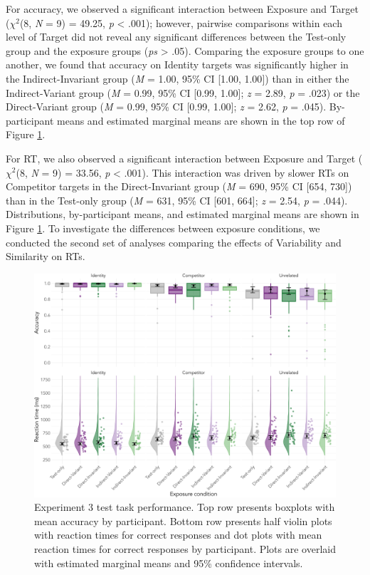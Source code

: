 \documentclass[preprint, 3p, authoryear]{elsarticle} %
\begin{document}
For accuracy, we observed a significant interaction between Exposure and Target (\(\chi^2\)(8, \emph{N} = 9) = 49.25, \emph{p} \textless{} .001); however, pairwise comparisons within each level of Target did not reveal any significant differences between the Test-only group and the exposure groups (\emph{ps} \textgreater{} .05).
Comparing the exposure groups to one another, we found that accuracy on Identity targets was significantly higher in the Indirect-Invariant group (\emph{M} = 1.00, 95\% CI {[}1.00, 1.00{]}) than in either the Indirect-Variant group (\emph{M} = 0.99, 95\% CI {[}0.99, 1.00{]}; \emph{z} = 2.89, \emph{p} = .023) or the Direct-Variant group (\emph{M} = 0.99, 95\% CI {[}0.99, 1.00{]}; \emph{z} = 2.62, \emph{p} = .045).
By-participant means and estimated marginal means are shown in the top row of Figure \ref{fig:exp3-test-fig1}.

For RT, we also observed a significant interaction between Exposure and Target (\(\chi^2\)(8, \emph{N} = 9) = 33.56, \emph{p} \textless{} .001).
This interaction was driven by slower RTs on Competitor targets in the Direct-Invariant group (\emph{M} = 690, 95\% CI {[}654, 730{]}) than in the Test-only group (\emph{M} = 631, 95\% CI {[}601, 664{]}; \emph{z} = 2.54, \emph{p} = .044).
Distributions, by-participant means, and estimated marginal means are shown in Figure \ref{fig:exp3-test-fig1}.
To investigate the differences between exposure conditions, we conducted the second set of analyses comparing the effects of Variability and Similarity on RTs.

\begin{figure}

{\centering \includegraphics[width=\textwidth]{sections/code/outputs/plot_test_2} 

}

\caption{Experiment 3 test task performance. Top row presents boxplots with mean accuracy by participant. Bottom row presents half violin plots with reaction times for correct responses and dot plots with mean reaction times for correct responses by participant. Plots are overlaid with estimated marginal means and 95\% confidence intervals.}\label{fig:exp3-test-fig1}
\end{figure}
\end{document}
